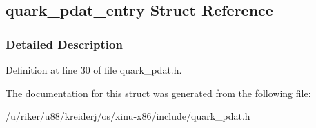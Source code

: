 \hypertarget{structquark__pdat__entry}{}\subsection{quark\+\_\+pdat\+\_\+entry Struct Reference}
\label{structquark__pdat__entry}


\subsubsection{Detailed Description}


Definition at line 30 of file quark\+\_\+pdat.\+h.



The documentation for this struct was generated from the following file\+:\begin{DoxyCompactItemize}
\item 
/u/riker/u88/kreiderj/os/xinu-\/x86/include/quark\+\_\+pdat.\+h\end{DoxyCompactItemize}
